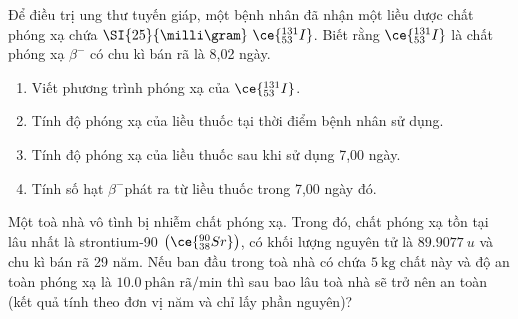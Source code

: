 \begin{ex}
	Để điều trị ung thư tuyến giáp, một bệnh nhân đã nhận một liều dược chất phóng xạ chứa $\SI{25}{\milli\gram}\  \ce{_{53}^{131}I}$. Biết rằng $\ce{_{53}^{131}I}$ là chất phóng xạ $\beta^{-}$ có chu kì bán rã là 8,02 ngày.
	\begin{enumerate}[label=\alph*)]
		\item Viết phương trình phóng xạ của $\ce{_{53}^{131}I}$.
		\item Tính độ phóng xạ của liều thuốc tại thời điểm bệnh nhân sử dụng.
		\item Tính độ phóng xạ của liều thuốc sau khi sử dụng 7,00 ngày.
		\item Tính số hạt $\beta^{-}$phát ra từ liều thuốc trong 7,00 ngày đó.
	\end{enumerate}
\end{ex}
\begin{ex}
	Một toà nhà vô tình bị nhiễm chất phóng xạ. Trong đó, chất phóng xạ tồn tại lâu nhất là strontium-90 $\left(\ce{^{90}_{38}Sr}\right)$, có khối lượng nguyên tử là $\SI{89.9077}{u}$ và chu kì bán rã 29 năm. Nếu ban đầu trong toà nhà có chứa $\SI{5}{\kilogram}$ chất này và độ an toàn phóng xạ là $\SI{10.0}{\text{phân rã}/\minute}$ thì sau bao lâu toà nhà sẽ trở nên an toàn (kết quả tính theo đơn vị năm và chỉ lấy phần nguyên)?
\end{ex}
